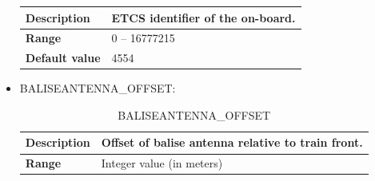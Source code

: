 \documentclass{template/openetcs}
\begin{document}
\begin{itemize}
\begin{longtable}{|l|l|}
					\begin{minipage}[t]{0.22\linewidth} \textbf{Description}	\end{minipage} 
				&	\begin{minipage}[t]{0.78\linewidth} ETCS identifier of the on-board. \end{minipage} \\
				
				\hline
																																									
					\begin{minipage}[t]{0.22\linewidth} \textbf{Range}	\end{minipage} 
				&	\begin{minipage}[t]{0.78\linewidth} 0 – 16777215 \end{minipage} \\
				
				\hline
				
					\begin{minipage}[t]{0.22\linewidth} \textbf{Default value}	\end{minipage} 
				&	\begin{minipage}[t]{0.78\linewidth} 4554 \end{minipage} \\
				
				\hline
				
			\end{longtable}
			
		\item BALISEANTENNA\_OFFSET:
																	
			\begin{longtable}{|l|l|}
				\caption{BALISEANTENNA\_OFFSET}\\ 
				\hline
				
					\begin{minipage}[t]{0.22\linewidth} \textbf{Description}	\end{minipage} 
				&	\begin{minipage}[t]{0.78\linewidth} Offset of balise antenna relative to train front. \end{minipage} \\
				
				\hline
																																									
					\begin{minipage}[t]{0.22\linewidth} \textbf{Range}	\end{minipage} 
				&	\begin{minipage}[t]{0.78\linewidth} Integer value (in meters) \end{minipage} \\
				

\end{longtable}
\end{itemize}
\end{document}
